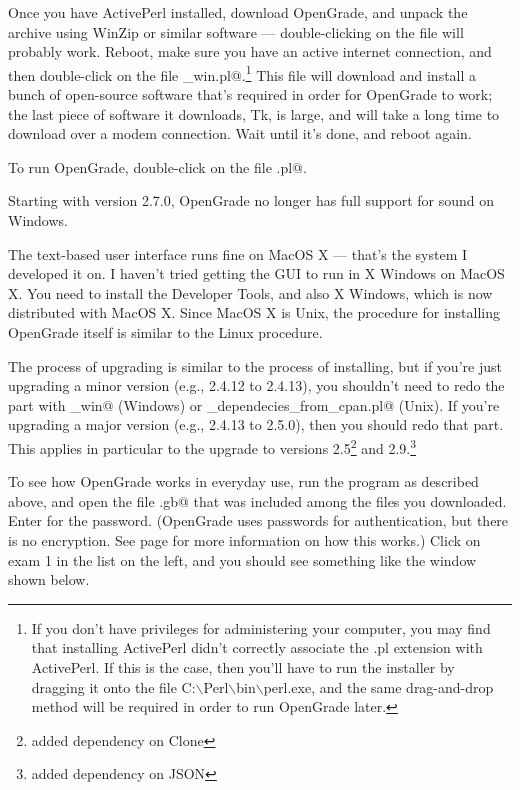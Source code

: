 \documentclass{opengrade_doc}
\begin{document}
Once you have ActivePerl installed, download
OpenGrade, and unpack the archive using WinZip or similar
software --- double-clicking on the file will probably work.
Reboot, make sure you have an active internet connection, and
then double-click on the file \verb@install_win.pl@.\footnote{If you don't
have privileges for administering your computer, you may find that installing
ActivePerl didn't correctly associate the .pl extension with ActivePerl. If this
is the case, then you'll have to run the installer by dragging it onto the file
C:$\backslash$Perl$\backslash$bin$\backslash$perl.exe, and the same drag-and-drop method will be required
in order to run OpenGrade later.} This file
will download and install a bunch of open-source software that's
required in order for OpenGrade to work; the last piece of software
it downloads, Tk, is large, and will take a long time to download over
a modem connection.
Wait until it's done, and reboot again.

 To run OpenGrade, double-click
on the file \verb@opengrade.pl@.

Starting with version 2.7.0, OpenGrade no longer has full support for sound on Windows.

The text-based user interface runs fine on MacOS X --- that's
the system I developed it on. I haven't tried getting the GUI
to run in X Windows on MacOS X.
You need to install the Developer Tools, and also X Windows, which is
now distributed with MacOS X.
Since MacOS X is Unix, the procedure for installing OpenGrade itself is similar
to the Linux procedure. 

\label{upgrading}
The process of upgrading is similar to the process of installing, but if you're just
upgrading a minor version (e.g., 2.4.12 to 2.4.13), you shouldn't need to redo the part with
\verb@install_win@ (Windows) or \verb@get_dependecies_from_cpan.pl@ (Unix).
If you're upgrading a major version (e.g., 2.4.13 to 2.5.0), then you should redo that part. 
This applies in particular to the upgrade to versions 2.5\footnote{added dependency on Clone} and 
2.9.\footnote{added dependency on JSON}


\label{gui}

To see how OpenGrade works in everyday use, run the program as
described above, and open the file \verb@sample.gb@ that was
included among the files you downloaded. Enter \verb@secret@ for
the password. (OpenGrade uses passwords for authentication, but
there is no encryption. See page \pageref{authentication} for
more information on how this works.) Click on
exam 1 in the list on the left, and you should see something
like the window shown below.
\end{document}
